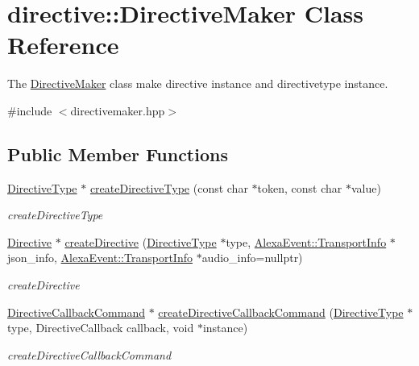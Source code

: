 \hypertarget{classdirective_1_1DirectiveMaker}{}\section{directive\+:\+:Directive\+Maker Class Reference}
\label{classdirective_1_1DirectiveMaker}


The \hyperlink{classdirective_1_1DirectiveMaker}{Directive\+Maker} class make directive instance and directivetype instance.  




{\ttfamily \#include $<$directivemaker.\+hpp$>$}

\subsection*{Public Member Functions}
\begin{DoxyCompactItemize}
\item 
\hyperlink{classdirective_1_1DirectiveType}{Directive\+Type} $\ast$ \hyperlink{classdirective_1_1DirectiveMaker_aadf8f7e4a9eb58511d370bad8dd2ce29}{create\+Directive\+Type} (const char $\ast$token, const char $\ast$value)
\begin{DoxyCompactList}\small\item\em create\+Directive\+Type \end{DoxyCompactList}\item 
\hyperlink{classdirective_1_1Directive}{Directive} $\ast$ \hyperlink{classdirective_1_1DirectiveMaker_a6086feb1f1e4f936081601e9e36d0b7a}{create\+Directive} (\hyperlink{classdirective_1_1DirectiveType}{Directive\+Type} $\ast$type, \hyperlink{classAlexaEvent_1_1TransportInfo}{Alexa\+Event\+::\+Transport\+Info} $\ast$json\+\_\+info, \hyperlink{classAlexaEvent_1_1TransportInfo}{Alexa\+Event\+::\+Transport\+Info} $\ast$audio\+\_\+info=nullptr)
\begin{DoxyCompactList}\small\item\em create\+Directive \end{DoxyCompactList}\item 
\hyperlink{classdirective_1_1DirectiveCallbackCommand}{Directive\+Callback\+Command} $\ast$ \hyperlink{classdirective_1_1DirectiveMaker_a4142b03d99c68aa806cd40901538ff5c}{create\+Directive\+Callback\+Command} (\hyperlink{classdirective_1_1DirectiveType}{Directive\+Type} $\ast$type, Directive\+Callback callback, void $\ast$instance)
\begin{DoxyCompactList}\small\item\em create\+Directive\+Callback\+Command \end{DoxyCompactList}\end{DoxyCompactItemize}


